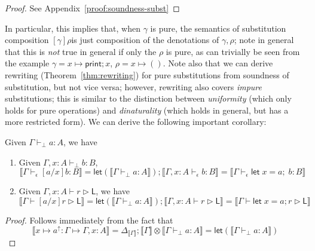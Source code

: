 \documentclass[acmsmall,screen,review]{acmart}
\newcommand{\ms}[1]{\ensuremath{\mathsf{#1}}}
\newcommand{\letexpr}[3]{\ensuremath{\ms{let}\;#1 = #2;\;#3}}
\newcommand{\letstmt}[3]{\ensuremath{\ms{let}\;#1 = #2; #3}}
\newcommand{\upg}[1]{{#1}^\uparrow}
\newcommand{\bhyp}[2]{#1 : #2}
\newcommand{\hasty}[4]{#1 \vdash_{#2} #3: {#4}}
\newcommand{\haslb}[3]{#1 \vdash #2 \rhd #3}
\newcommand{\issubst}[3]{#1: #2 \mapsto #3}
\newcommand{\dnt}[1]{\llbracket{#1}\rrbracket}
\newcommand{\lmor}[1]{\ms{let}(#1)}
\begin{document}
\begin{proof}
  See Appendix~\ref{proof:soundness-subst}
\end{proof}
In particular, this implies that, when $\gamma$ is pure, the semantics of substitution composition
$[\gamma]\rho$is just composition of the denotations of $\gamma, \rho$; note in general that this is
\emph{not} true in general if only the $\rho$ is pure, as can trivially be seen from the example
\(\gamma = x \mapsto \ms{print}; x\), \(\rho = x \mapsto ()\). Note also that we can derive
rewriting (Theorem~\ref{thm:rewriting}) for pure substitutions from soundness of substitution, but
not vice versa; however, rewriting also covers \emph{impure} substitutions; this is similar to the
distinction between \emph{uniformity} (which only holds for pure operations) and \emph{dinaturality}
(which holds in general, but has a more restricted form). We can derive the following important
corollary:
\begin{corollary}
  Given $\hasty{\Gamma}{\bot}{a}{A}$, we have
  \begin{enumerate}
    \item Given $\hasty{\Gamma, \bhyp{x}{A}}{\bot}{b}{B}$,
    \begin{equation}
      \dnt{\hasty{\Gamma}{\epsilon}{[a/x]b}{B}}
      = \lmor{\dnt{\hasty{\Gamma}{\bot}{a}{A}}} 
        ; \dnt{\hasty{\Gamma, \bhyp{x}{A}}{\epsilon}{b}{B}}
      = \dnt{\hasty{\Gamma}{\epsilon}{\letexpr{x}{a}{b}}{B}}
    \end{equation}
    \item Given $\haslb{\Gamma, \bhyp{x}{A}}{r}{\ms{L}}$, we have
    \begin{equation}
      \dnt{\haslb{\Gamma}{[a/x]r}{\ms{L}}}
      = \lmor{\dnt{\hasty{\Gamma}{\bot}{a}{A}}}
        ; \dnt{\haslb{\Gamma, \bhyp{x}{A}}{r}{\ms{L}}}
      = \dnt{\haslb{\Gamma}{\letstmt{x}{a}{r}}{\ms{L}}}
    \end{equation}
  \end{enumerate}
  \label{corr:single-subst}
\end{corollary}
\begin{proof}
  Follows immediately from the fact that 
  \begin{equation}
    \dnt{\issubst{\upg{x \mapsto a}}{\Gamma}{\Gamma, \bhyp{x}{A}}} 
    = \Delta_{\dnt{\Gamma}} ; \dnt{\Gamma} \otimes \dnt{\hasty{\Gamma}{\bot}{a}{A}}
    = \lmor{\dnt{\hasty{\Gamma}{\bot}{a}{A}}}
  \end{equation}
\end{proof}
\end{document}
